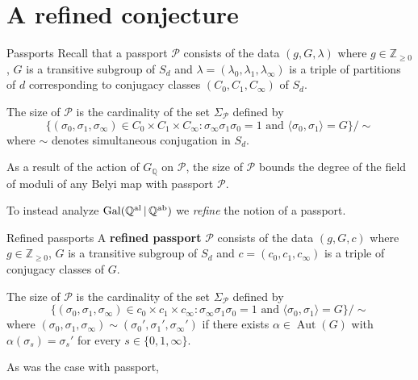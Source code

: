 \documentclass[xcolor=dvipsnames]{beamer}
\theoremstyle{plain}
\newcommand{\QQ}{\mathbb Q}
\newcommand{\ZZ}{\mathbb Z}
\newcommand{\QQal}{{\mathbb Q}^{\textup{al}}}
\newcommand{\QQab}{{\mathbb Q}^{\textup{ab}}}
\DeclareMathOperator{\Aut}{Aut}
\DeclareMathOperator{\Gal}{Gal}
\begin{document}
  \section{A refined conjecture}{
    \begin{frame}{Passports}
      Recall that a passport $\mathcal{P}$
      consists of the data
      $(g,G,\lambda)$
      where $g\in\ZZ_{\geq 0}$,
      $G$ is a transitive subgroup of $S_d$
      and $\lambda = (\lambda_0,\lambda_1,\lambda_\infty)$
      is a triple of partitions of $d$
      corresponding to conjugacy classes $(C_0,C_1,C_\infty)$
      of $S_d$.
      \pause\par
      The size of
      $\mathcal{P}$ is the cardinality of the
      set
      $\Sigma_\mathcal{P}$
      defined by
      \[
        \Big\{
          (\sigma_0,\sigma_1,\sigma_\infty)\in C_0\times C_1\times C_\infty :
          \sigma_\infty\sigma_1\sigma_0=1
          \text{ and }
          \langle\sigma_0,\sigma_1\rangle=G
        \Big\}/\!\!\sim
      \]
      where $\sim$ denotes simultaneous conjugation in $S_d$.
      \pause\par
      As a result of the action of
      $G_\QQ$ on $\mathcal{P}$,
      the size of $\mathcal{P}$ bounds the degree of the field
      of moduli of any Belyi map with passport
      $\mathcal{P}$.
      \pause\par
      To instead analyze
      $\Gal(\QQal\,|\,\QQab)$
      we \emph{refine} the notion of a passport.
    \end{frame}
    \begin{frame}{Refined passports}
      A \textbf{refined passport} $\mathscr{P}$
      consists of the data
      $(g,G,c)$
      where $g\in\ZZ_{\geq 0}$,
      $G$ is a transitive subgroup of $S_d$
      and $c = (c_0,c_1,c_\infty)$
      is a triple of conjugacy classes
      of $G$.
      \pause\par
      The size of
      $\mathscr{P}$ is the cardinality of the
      set
      $\Sigma_\mathscr{P}$
      defined by
      \[
        \Big\{
          (\sigma_0,\sigma_1,\sigma_\infty)\in c_0\times c_1\times c_\infty :
          \sigma_\infty\sigma_1\sigma_0=1
          \text{ and }
          \langle\sigma_0,\sigma_1\rangle=G
        \Big\}/\!\!\sim
      \]
      where
      $(\sigma_0,\sigma_1,\sigma_\infty)\sim
      (\sigma_0',\sigma_1',\sigma_\infty')$
      if there exists $\alpha\in\Aut(G)$
      with $\alpha(\sigma_s) = \sigma_s'$ for
      every $s\in\{0,1,\infty\}$.
      \pause\par
      As was the case with passport,

\end{frame}}
\end{document}
